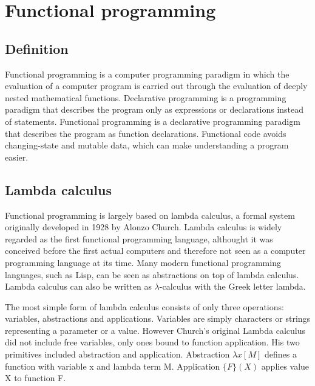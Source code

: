 \chapter{Functional programming} \label{Functional programming}


\section{Definition}
Functional programming is a computer programming paradigm in which the evaluation of a computer program is carried out
through the evaluation of deeply nested mathematical functions. Declarative programming is a programming paradigm that
describes the program only as expressions or declarations instead of statements. Functional programming is a declarative
programming paradigm that describes the program as function declarations. Functional code avoids changing-state and
mutable data, which can make understanding a program easier.\cite{hudak}

\section{Lambda calculus}
Functional programming is largely based on lambda calculus, a formal system originally developed in 1928 by Alonzo
Church. Lambda calculus is widely regarded as the first functional programming language, althought it was conceived
before the first actual computers and therefore not seen as a computer programming language at its time. Many modern
functional programming languages, such as Lisp, can be seen as abstractions on top of lambda calculus. Lambda calculus
can also be written as $\lambda$-calculus with the Greek letter lambda.\cite{hudak}

The most simple form of lambda calculus consists of only three operations: variables, abstractions and applications.
Variables are simply characters or strings representing a parameter or a value. However Church's original Lambda
calculus did not include free variables, only ones bound to function application. His two primitives included
abstraction and application. Abstraction $\lambda x [ M ] $ defines a function with variable x and lambda term M.
Application $ \{ F \} ( X ) $ applies value X to function F.\cite{lambdacalculus}


